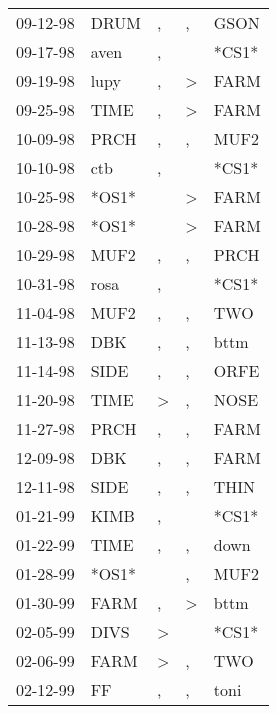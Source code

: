 \begin{supertabular}{lllll}
 09-12-98 &   DRUM &                , &                , &   GSON \\
 09-17-98 &   aven &                , &                  &  *CS1* \\
 09-19-98 &   lupy &                , &     \textgreater &   FARM \\
 09-25-98 &   TIME &                , &     \textgreater &   FARM \\
 10-09-98 &   PRCH &                , &                , &   MUF2 \\
 10-10-98 &    ctb &                , &                  &  *CS1* \\
 10-25-98 &  *OS1* &                  &     \textgreater &   FARM \\
 10-28-98 &  *OS1* &                  &     \textgreater &   FARM \\
 10-29-98 &   MUF2 &                , &                , &   PRCH \\
 10-31-98 &   rosa &                , &                  &  *CS1* \\
 11-04-98 &   MUF2 &                , &                , &    TWO \\
 11-13-98 &    DBK &                , &                , &   bttm \\
 11-14-98 &   SIDE &                , &                , &   ORFE \\
 11-20-98 &   TIME &     \textgreater &                , &   NOSE \\
 11-27-98 &   PRCH &                , &                , &   FARM \\
 12-09-98 &    DBK &                , &                , &   FARM \\
 12-11-98 &   SIDE &                , &                , &   THIN \\
 01-21-99 &   KIMB &                , &                  &  *CS1* \\
 01-22-99 &   TIME &                , &                , &   down \\
 01-28-99 &  *OS1* &                  &                , &   MUF2 \\
 01-30-99 &   FARM &                , &     \textgreater &   bttm \\
 02-05-99 &   DIVS &     \textgreater &                  &  *CS1* \\
 02-06-99 &   FARM &     \textgreater &                , &    TWO \\
 02-12-99 &     FF &                , &                , &   toni \\

\end{supertabular}
